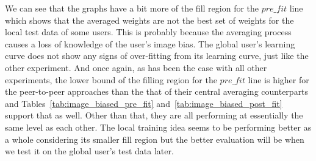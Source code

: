 \documentclass[12pt]{article}
\begin{document}
\noindent We can see that the graphs have a bit more of the fill region for the $pre\_fit$ line which shows that the averaged weights are not the best set of weights for the local test data of some users. This is probably because the averaging process causes a loss of knowledge of the user's image bias. The global user's learning curve does not show any signs of over-fitting from its learning curve, just like the other experiment. And once again, as has been the case with all other experiments, the lower bound of the filling region for the $pre\_fit$ line is higher for the peer-to-peer approaches than the that of their central averaging counterparts and Tables~\ref{tab:image_biased_pre_fit} and~\ref{tab:image_biased_post_fit} support that as well. Other than that, they are all performing at essentially the same level as each other. The local training idea seems to be performing better as a whole considering its smaller fill region but the better evaluation will be when we test it on the global user's test data later.
\begin{table}[H] %
\def\arraystretch{1.2}%
\caption{Images dataset: Pre fit results at the end of the rounds from testing user models with $P = 0.7$.} \label{tab:image_biased_pre_fit}
\end{table}
\end{document}
